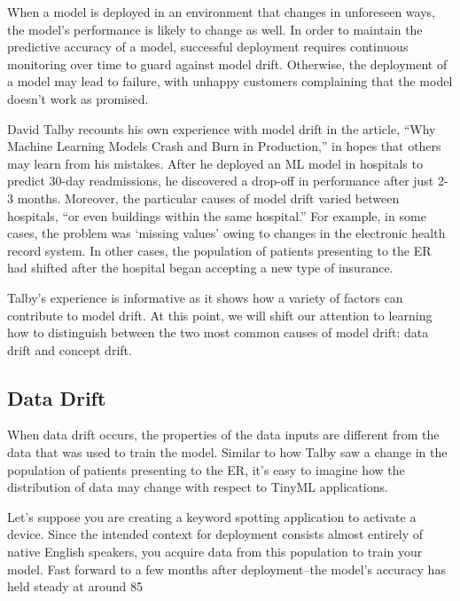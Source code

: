     When a model is deployed in an environment that changes in unforeseen ways, the model’s performance is likely to change as well. In order to maintain the predictive accuracy of a model, successful deployment requires continuous monitoring over time to guard against model drift. Otherwise, the deployment of a model may lead to failure, with unhappy customers complaining that the model doesn’t work as promised.
    
    David Talby recounts his own experience with model drift in the article, “Why Machine Learning Models Crash and Burn in Production,” in hopes that others may learn from his mistakes. After he deployed an ML model in hospitals to predict 30-day readmissions, he discovered a drop-off in performance after just 2-3 months. Moreover, the particular causes of model drift varied between hospitals, “or even buildings within the same hospital.” For example, in some cases, the problem was ‘missing values’ owing to changes in the electronic health record system. In other cases, the population of patients presenting to the ER had shifted after the hospital began accepting a new type of insurance.
    
    Talby’s experience is informative as it shows how a variety of factors can contribute to model drift. At this point, we will shift our attention to learning how to distinguish between the two most common causes of model drift: data drift and concept drift.
    
\subsection{Data Drift}

    When data drift occurs, the properties of the data inputs are different from the data that was used to train the model. Similar to how Talby saw a change in the population of patients presenting to the ER, it’s easy to imagine how the distribution of data may change with respect to TinyML applications.
    
    Let’s suppose you are creating a keyword spotting application to activate a device. Since the intended context for deployment consists almost entirely of native English speakers, you acquire data from this population to train your model. Fast forward to a few months after deployment--the model’s accuracy has held steady at around 85%
    
